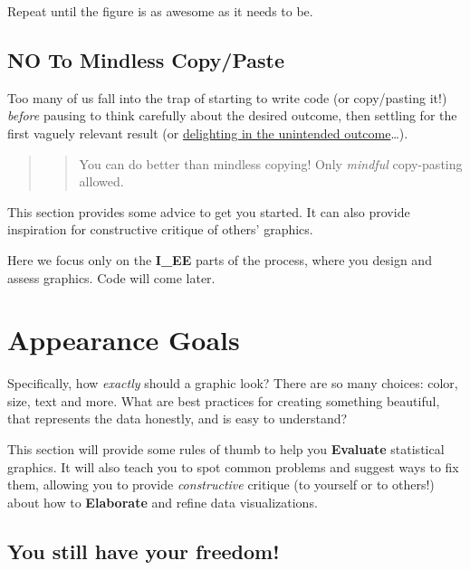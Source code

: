 \documentclass[
  letterpaper,
  DIV=11,
  numbers=noendperiod]{scrreprt}
\theoremstyle{remark}
\begin{document}
Repeat until the figure is as awesome as it needs to be.

\subsection*{NO To Mindless Copy/Paste}\label{no-to-mindless-copypaste}

Too many of us fall into the trap of starting to write code (or
copy/pasting it!) \emph{before} pausing to think carefully about the
desired outcome, then settling for the first vaguely relevant result (or
\href{https://twitter.com/accidental__art?lang=en}{delighting in the
unintended outcome}\ldots).

\begin{quote}
\begin{quote}
You can do better than mindless copying! Only \emph{mindful}
copy-pasting allowed.
\end{quote}
\end{quote}

This section provides some advice to get you started. It can also
provide inspiration for constructive critique of others' graphics.

Here we focus only on the \textbf{I\_EE} parts of the process, where you
design and assess graphics. Code will come later.

\section*{Appearance Goals}\label{appearance-goals}


Specifically, how \emph{exactly} should a graphic look? There are so
many choices: color, size, text and more. What are best practices for
creating something beautiful, that represents the data honestly, and is
easy to understand?

This section will provide some rules of thumb to help you
\textbf{Evaluate} statistical graphics. It will also teach you to spot
common problems and suggest ways to fix them, allowing you to provide
\emph{constructive} critique (to yourself or to others!) about how to
\textbf{Elaborate} and refine data visualizations.

\subsection*{You still have your
freedom!}\label{you-still-have-your-freedom}
\end{document}
